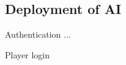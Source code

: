 \documentclass{beamer}
\begin{document}
\subsection{Deployment of AI}
\begin{frame}{Authentication}
...
\end{frame}
\begin{frame}{Player login}
\begin{figure}[H]
\end{figure}
\end{frame}
\end{document}
